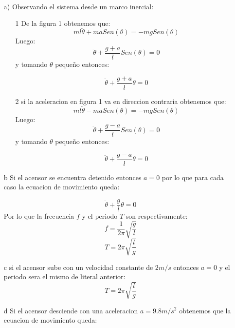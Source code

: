 \documentclass[a4paper]{article}
\begin{document}
\begin{answer}[Problema 3.]

    \begin{enumerate}
        \item[a)] Observando el sistema desde un marco inercial:
            \begin{enumerate}

                \item[1] De la figura 1 obtenemos que:
                    \begin{equation*}
                        ml\ddot{\theta} + maSen(\theta) = -mgSen(\theta)
                    \end{equation*}
                    Luego:
                    \begin{equation*}
                        \ddot{\theta} + \frac{g+a}{l}Sen(\theta) = 0
                    \end{equation*}
                    y tomando $\theta$ pequeño  entonces:

                    \begin{equation*}
                        \ddot{\theta} + \frac{g+a}{l}\theta = 0
                    \end{equation*}
                \item[2]  si la aceleracion en figura 1 va en direccion contraria obtenemos que:
                    \begin{equation*}
                        ml\ddot{\theta}- maSen(\theta) = -mgSen(\theta)
                    \end{equation*}
                    Luego:
                    \begin{equation*}
                        \ddot{\theta} + \frac{g-a}{l}Sen(\theta) = 0
                    \end{equation*}
                    y tomando $\theta$ pequeño  entonces:

                    \begin{equation*}
                        \ddot{\theta} + \frac{g-a}{l}\theta = 0
                    \end{equation*}
            \end{enumerate}
        \item[b] Si el acensor se encuentra detenido entonces $a=0$ por lo que para cada caso la ecuacion de movimiento queda:

            \begin{equation*}
                \ddot{\theta} + \frac{g}{l}\theta = 0
            \end{equation*}
            Por lo que la frecuencia $f$ y el periodo $T$ son respectivamente:
            $$f = \frac{1}{2\pi} \sqrt{\frac{g}{l}}$$
            $$T = 2\pi \sqrt{\frac{l}{g}}$$
        \item[c] si el acensor sube con un velocidad constante de $2m/s$ entonces $a = 0$ y el periodo sera el mismo de literal anterior:
            $$T = 2\pi\sqrt{\frac{l}{g}}$$
        \item[d] Si el acensor desciende con una aceleracion $a = 9.8m/s^2$ obtenemos que la ecuacion de movimiento queda:


\end{enumerate}
\end{answer}
\end{document}
